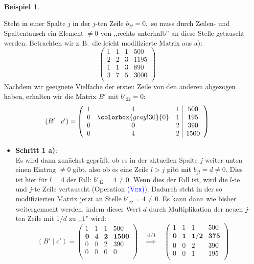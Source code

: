 \documentclass[a4paper,11pt,oneside]{article}
\theoremstyle{definition}
\newtheorem{example}{Beispiel}
\def\GB#1{\colorbox{gray!30}{#1}}
\def\OP#1{\textcolor{blue}{(\textnormal{\textrm{\textsc{#1}})}}}
\begin{document}
\begin{example}
\begin{enumerate}
Steht in einer Spalte $j$ in der $j$-ten Zeile $b_{jj}=0,$ so muss durch Zeilen- und Spaltentausch ein Element $\neq0$ von ,,rechts unterhalb'' an diese Stelle getauscht werden.  Betrachten wir z.\,B.\ die leicht modifizierte Matrix aus a):
\[
\left(\begin{array}{ccc|c}
1&1&1&500\\
2&2&3&1195\\
1&1&3&890\\
3&7&5&3000\\
\end{array}\right)
\]
Nachdem wir geeignete Vielfache der ersten Zeile von den anderen abgezogen haben, erhalten wir die Matrix $B'$ mit $b'_{22}=0$:
\[
(B'\mid c')=\left(\begin{array}{ccc|c}
1&1&1&500\\
0&\GB{0}&1&195\\
0&0&2&390\\
0&4&2&1500\\
\end{array}\right)
\]
\begin{itemize}
\item
\textbf{Schritt 1 a)}:~\\
Es wird dann zunächst geprüft, ob es in der aktuellen Spalte $j$ weiter unten einen Eintrag $ \neq0$ gibt, also ob es eine Zeile $l>j$ gibt mit $b_{jl}= d\neq0$. Dies ist hier für $l=4$ der Fall: $b'_{42}=4\neq0$. Wenn dies der Fall ist, wird die $l$-te und $ j$-te Zeile vertauscht (Operation \OP{Ver}). Dadurch steht in der so modifizierten Matrix jetzt an Stelle $b'_{jj}=4\neq0$. Es kann dann wie bisher weitergemacht werden, indem dieser Wert $d$ durch Multiplikation der neuen $j$-ten Zeile mit $1/d$ zu ,,$1$'' wird:
\[
(B'\mid c')=\left(\begin{array}{ccc|c}
1&1&1&500\\
\bm{0}&\bm{4}&\bm{2}&\bm{1500}\\
0&0&2&390\\
0&0&0&0\\
\end{array}\right)
\quad \stackrel{\cdot 1/4}{\Longrightarrow}\quad
\left(\begin{array}{ccc|c}
1&1&1&500\\
\bm{0}&\bm{1}&\bm{1/2}&\bm{375}\\
0&0&2&390\\
0&0&1&195\\
\end{array}\right)
\]


\end{itemize}
\end{enumerate}
\end{example}
\end{document}
